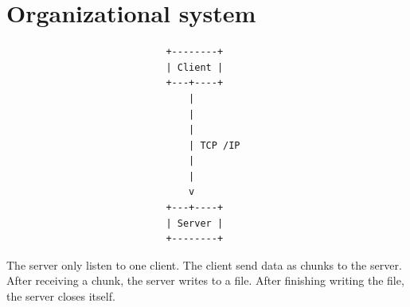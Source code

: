\documentclass[11pt, a4paper]{article}
\begin{document}
\newpage
\section{Organizational system }
\vspace{1cm}
\begin{verbatim}
                            +--------+
                            | Client |
                            +---+----+
                                |
                                |
                                |
                                | TCP /IP
                                |
                                |
                                v
                            +---+----+
                            | Server |
                            +--------+
\end{verbatim}
\vspace{0.5cm}
\begin{flushleft}
 The server only listen to one client. The client send data as chunks to the server. After receiving a chunk, the server writes to a file. After finishing writing the file, the server closes itself.
\end{flushleft}
\vspace{0.1cm}
\end{document}
